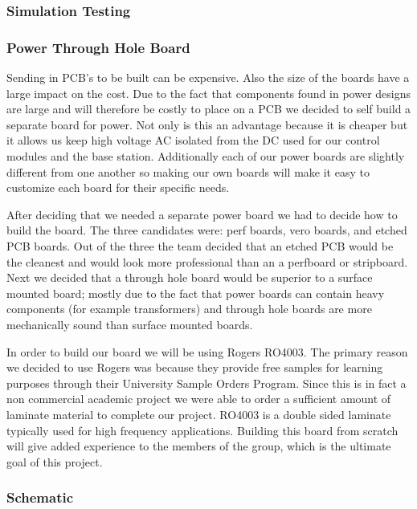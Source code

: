 \subsubsection{Simulation Testing}

\subsubsection{Power Through Hole Board}
\label{sec:power-through}
Sending in PCB{}'s to be built can be expensive. Also the size of the boards
have a large impact on the cost. Due to the fact that components found in power
designs are large and will therefore be costly to place on a PCB we decided to
self build a separate board for power. Not only is this an advantage because it
is cheaper but it allows us keep high voltage AC isolated from the DC used for
our control modules and the base station. Additionally each of our power boards
are slightly different from one another so making our own boards will make it
easy to customize each board for their specific needs.

After deciding that we needed a separate power board we had to decide how to
build the board. The three candidates were: perf boards, vero boards, and
etched PCB boards. Out of the three the team decided that an etched PCB would
be the cleanest and would look more professional than an a perfboard or
stripboard. Next we decided that a through hole board would be superior to a
surface mounted board; mostly due to the fact that power boards can contain
heavy components (for example transformers) and through hole boards are more
mechanically sound than surface mounted boards.

In order to build our board we will be using Rogers RO4003. The primary reason
we decided to use Rogers was because they provide free samples for learning
purposes through their University Sample Orders Program. Since this is in fact
a non commercial academic project we were able to order a sufficient amount of
laminate material to complete our project.  RO4003 is a double sided laminate
typically used for high frequency applications. Building this board from
scratch will give added experience to the members of the group, which is the
ultimate goal of this project.

\subsubsection{Schematic}


